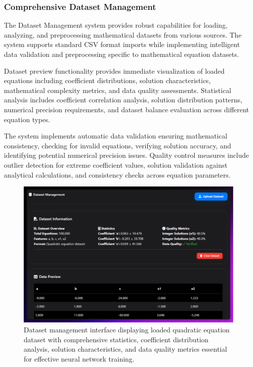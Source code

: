 \documentclass[11pt,a4paper]{report}
\begin{document}
\subsubsection{Comprehensive Dataset Management}

The Dataset Management system provides robust capabilities for loading, analyzing, and preprocessing mathematical datasets from various sources. The system supports standard CSV format imports while implementing intelligent data validation and preprocessing specific to mathematical equation datasets.

Dataset preview functionality provides immediate visualization of loaded equations including coefficient distributions, solution characteristics, mathematical complexity metrics, and data quality assessments. Statistical analysis includes coefficient correlation analysis, solution distribution patterns, numerical precision requirements, and dataset balance evaluation across different equation types.

The system implements automatic data validation ensuring mathematical consistency, checking for invalid equations, verifying solution accuracy, and identifying potential numerical precision issues. Quality control measures include outlier detection for extreme coefficient values, solution validation against analytical calculations, and consistency checks across equation parameters.

\begin{figure}[H]
\centering
\includegraphics[width=\textwidth]{quadratic_predictor_dataset_tab.png}
\caption{Dataset management interface displaying loaded quadratic equation dataset with comprehensive statistics, coefficient distribution analysis, solution characteristics, and data quality metrics essential for effective neural network training.}
\label{fig:quadratic_dataset}
\end{figure}
\end{document}
